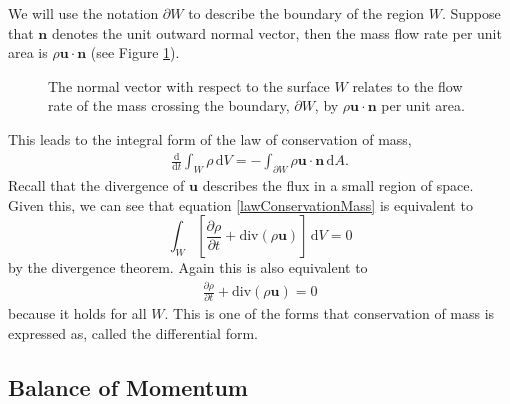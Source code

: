 \documentclass[undefended]{sfuthesis}
\begin{document}
We will use the notation $\partial W$ to describe the boundary of the region $W$. Suppose that $\textbf{n}$ denotes the unit outward normal vector, then the mass flow rate per unit area is $\rho \textbf{u} \cdot \textbf{n}$ (see Figure \ref{fig:boundary}). 
\begin{figure}[h!]
\centering
{}
\caption{The normal vector with respect to the surface $W$ relates to the flow rate of the mass crossing the boundary, $\partial W$, by $\rho \textbf{u} \cdot \textbf{n}$ per unit area.}
\label{fig:boundary}
\end{figure}

This leads to the integral form of the law of conservation of mass, 
\begin{align}
\frac{\mathrm{d}}{\mathrm{d} t} \int_W \rho \,\mathrm{d}V = - \int_{\partial W} \rho \textbf{u} \cdot \textbf{n} \,\mathrm{d} A. \label{lawConservationMass}
\end{align}
Recall that the divergence of $\textbf{u}$ describes the flux in a small region of space. Given this, we can see that equation \eqref{lawConservationMass} is equivalent to \[\int_W \left[\frac{\partial \rho}{\partial t} + \mathrm{div}(\rho \textbf{u})\right] \,\mathrm{d} V = 0\] by the divergence theorem. Again this is also equivalent to 
\begin{align}
\frac{\partial \rho}{\partial t} + \mathrm{div}(\rho \textbf{u}) = 0 \label{conservationMassEq}
\end{align}
because it holds for all $W$. This is one of the forms that conservation of mass is expressed as, called the differential form.

\subsection{Balance of Momentum}
\end{document}
